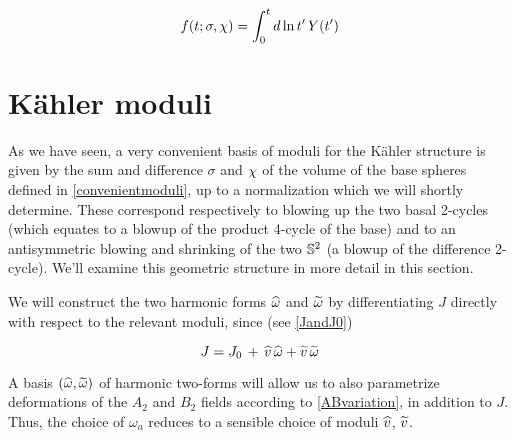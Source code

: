 \begin{equation}
	f(t;\sigma,\chi) = \int_0^{t} d\ln t' \,Y(t')
	\label{}
\end{equation}

\section{K\"ahler moduli}

As we have seen, a very convenient basis of moduli for the K\"ahler structure is given by the sum and difference $\sigma$ and $\chi$ of the volume of the base spheres defined in \eqref{convenientmoduli}, up to a normalization which we will shortly determine. These correspond respectively to blowing up the two basal 2-cycles (which equates to a blowup of the product 4-cycle of the base) and to an antisymmetric blowing and shrinking of the two $\mathbb{S}^2$ (a blowup of the difference 2-cycle). We'll examine this geometric structure in more detail in this section.

We will construct the two harmonic forms $\widehat{\omega}$ and $\widetilde{\omega}$ by differentiating $J$ directly with respect to the relevant moduli, since (see \eqref{JandJ0})

\begin{equation}
	J = J_0 \,+ \, \widehat{v} \,\widehat{\omega} + \widetilde{v} \,\widetilde{\omega}
	\label{}
\end{equation}

A basis $(\widehat{\omega},\widetilde{\omega})$ of harmonic two-forms will allow us to also parametrize deformations of the $A_2$ and $B_2$ fields according to \eqref{ABvariation}, in addition to $J$. Thus, the choice of $\omega_a$ reduces to a sensible choice of moduli $\widehat{v}$, $\widetilde{v}$.


%

